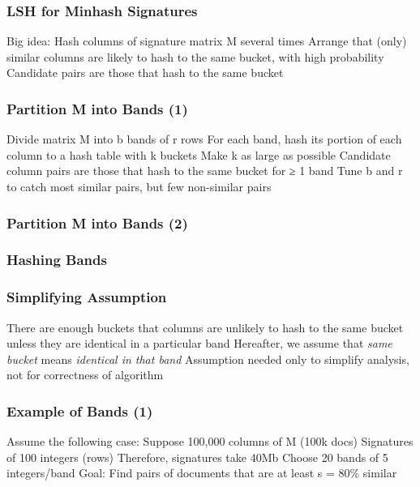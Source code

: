 \documentclass[svgnames]{beamer}
\begin{document}
  
\begin{frame} \frametitle{LSH for Minhash Signatures}

Big idea: Hash columns of signature matrix M several times
Arrange that (only) similar columns are likely to hash to the same bucket, with high probability
Candidate pairs are those that hash to the same bucket

\end{frame}

  
\begin{frame} \frametitle{Partition M into Bands (1)}

Divide matrix M into b bands of r rows
For each band, hash its portion of each column to a hash table with k buckets
Make k as large as possible
Candidate column pairs are those that hash to the same bucket for ≥ 1 band
Tune b and r to catch most similar pairs, but few non-similar pairs

\end{frame}

  
\begin{frame} \frametitle{Partition M into Bands (2)}


\end{frame}

  
\begin{frame} \frametitle{Hashing Bands}


\end{frame}

  
\begin{frame} \frametitle{Simplifying Assumption}

There are enough buckets that columns are unlikely to hash to the same bucket unless they are identical in a particular band
Hereafter, we assume that \emph{same bucket} means \emph{identical in that band}
Assumption needed only to simplify analysis, not for correctness of algorithm

\end{frame}

  
\begin{frame} \frametitle{Example of Bands (1)}

Assume the following case:
  Suppose 100,000 columns of M (100k docs)
  Signatures of 100 integers (rows)
  Therefore, signatures take 40Mb
  Choose 20 bands of 5 integers/band
Goal: Find pairs of documents that are at least s = 80\% similar

\end{frame}
\end{document}
